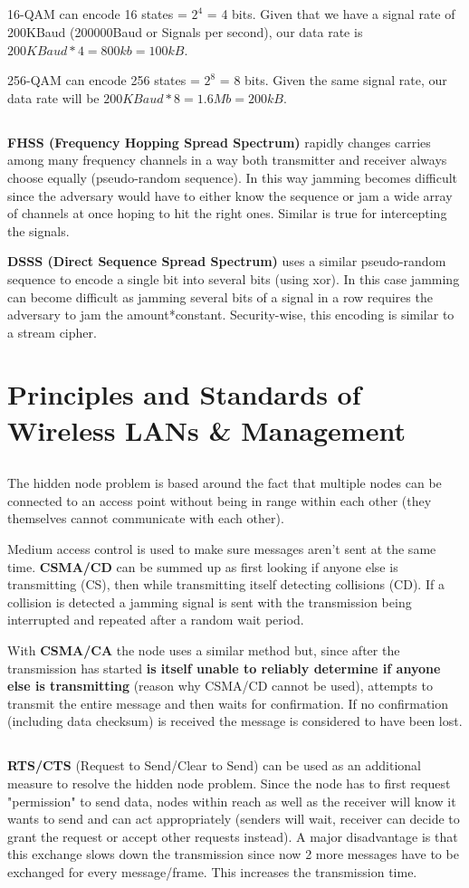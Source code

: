 \documentclass[12pt]{article}
\newcommand{\exercise}{\subsection{}\setcounter{subsubsection}{0}}
\begin{document}
\exercise
16-QAM can encode 16 states = $2^4$ = 4 bits. Given that we have a signal rate of 200KBaud (200000Baud or Signals per second), our data rate is $200KBaud*4=800kb=100kB$.

256-QAM can encode 256 states = $2^8$ = 8 bits. Given the same signal rate, our data rate will be $200KBaud*8=1.6Mb=200kB$.

\exercise
\textbf{FHSS (Frequency Hopping Spread Spectrum)} rapidly changes carries among many frequency channels in a way both transmitter and receiver always choose equally (pseudo-random sequence). In this way jamming becomes difficult since the adversary would have to either know the sequence or jam a wide array of channels at once hoping to hit the right ones. Similar is true for intercepting the signals.

\textbf{DSSS (Direct Sequence Spread Spectrum)} uses a similar pseudo-random sequence to encode a single bit into several bits (using xor). In this case jamming can become difficult as jamming several bits of a signal in a row requires the adversary to jam the amount*constant. Security-wise, this encoding is similar to a stream cipher.

\section*{Principles and Standards of Wireless LANs \& Management}
\exercise
The hidden node problem is based around the fact that multiple nodes can be connected to an access point without being in range within each other (they themselves cannot communicate with each other).

Medium access control is used to make sure messages aren't sent at the same time. \textbf{CSMA/CD} can be summed up as first looking if anyone else is transmitting (CS), then while transmitting itself detecting collisions (CD). If a collision is detected a jamming signal is sent with the transmission being interrupted and repeated after a random wait period.

With \textbf{CSMA/CA} the node uses a similar method but, since after the transmission has started \textbf{is itself unable to reliably determine if anyone else is transmitting} (reason why CSMA/CD cannot be used), attempts to transmit the entire message and then waits for confirmation. If no confirmation (including data checksum) is received the message is considered to have been lost.

\exercise
\textbf{RTS/CTS} (Request to Send/Clear to Send) can be used as an additional measure to resolve the hidden node problem. Since the node has to first request "permission" to send data, nodes within reach as well as the receiver will know it wants to send and can act appropriately (senders will wait, receiver can decide to grant the request or accept other requests instead). A major disadvantage is that this exchange slows down the transmission since now 2 more messages have to be exchanged for every message/frame. This increases the transmission time.
\end{document}
